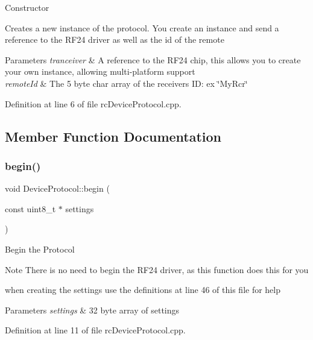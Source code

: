 Constructor

Creates a new instance of the protocol. You create an instance and send a reference to the R\+F24 driver as well as the id of the remote


\begin{DoxyParams}{Parameters}
{\em tranceiver} & A reference to the R\+F24 chip, this allows you to create your own instance, allowing multi-\/platform support \\
\hline
{\em remote\+Id} & The 5 byte char array of the receiver\textquotesingle{}s ID\+: ex \char`\"{}\+My\+Rcr\char`\"{} \\
\hline
\end{DoxyParams}


Definition at line 6 of file rc\+Device\+Protocol.\+cpp.



\subsection{Member Function Documentation}
\mbox{\label{classDeviceProtocol_aabea2ff004b2ae58be66ed675a0cf7b8}} 
\subsubsection{\texorpdfstring{begin()}{begin()}}
{\footnotesize\ttfamily void Device\+Protocol\+::begin (\begin{DoxyParamCaption}\item[{const uint8\+\_\+t $\ast$}]{settings }\end{DoxyParamCaption})}

Begin the Protocol

\begin{DoxyNote}{Note}
There is no need to begin the R\+F24 driver, as this function does this for you

when creating the settings use the definitions at line 46 of this file for help
\end{DoxyNote}

\begin{DoxyParams}{Parameters}
{\em settings} & 32 byte array of settings \\
\hline
\end{DoxyParams}


Definition at line 11 of file rc\+Device\+Protocol.\+cpp.

